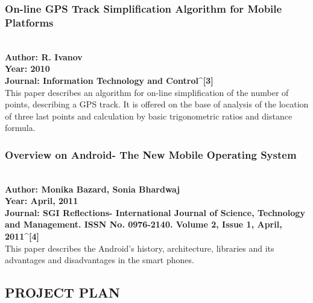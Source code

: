 \documentclass[12pt,a4paper]{article}
\begin{document}
\subsubsection{On-line GPS Track Simplification Algorithm for Mobile Platforms}
\\
\textbf{Author:	R. Ivanov
\\
	Year:		2010
\\
	Journal:	Information Technology and Control^{[3]}
}
\\
\hspace{0.7 cm}This paper describes an algorithm for on-line simplification of the number of points, describing a GPS track. It is offered on the base of analysis of the location of three last points and calculation by basic trigonometric ratios and distance formula.
\\

\subsubsection{Overview on Android- The New Mobile Operating System}
\\
\textbf{Author:	Monika Bazard, Sonia Bhardwaj
\\
Year:		April, 2011
\\
Journal:	SGI Reflections- International Journal of Science, Technology and Management. ISSN No. 0976-2140. Volume 2, Issue 1, April, 2011^{[4]}
}
\\
\hspace{0.7 cm}This paper describes the Android’s history, architecture, libraries and its advantages and disadvantages in the smart phones.
\\


\newpage
\begin{center}
\pagestyle{plain} 
\section{PROJECT PLAN}
\end{center}
\hspace{0.7cm}\\
\pagestyle{plain} 
\end{document}
